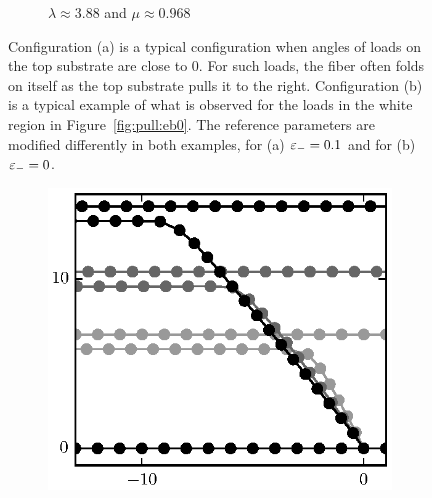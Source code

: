 \begin{figure}[t]
\begin{subfigure}{.5\textwidth}
         \caption{$\lambda\approx3.88$ and $\mu\approx0.968$\label{subfig:barely_adhered}}
      \end{subfigure}
      \caption{Configuration (a) is a typical configuration when angles of loads on the top substrate are close to 0. For such loads, the fiber often folds on itself as the top substrate pulls it to the right. Configuration (b) is a typical example of what is observed for the loads in the white region in Figure~\ref{fig:pull:eb0}. The reference parameters are modified differently in both examples, for (a) $\varepsilon_-=0.1$ and for (b) $\varepsilon_-=0$.\label{fig:pull_equil}} 
   \end{figure}

   \begin{figure}[t]
      \centering
      \begin{subfigure}{.5\textwidth}
         \centering
         \includegraphics{./fig/ch3/pull/unzip_anim.eps}
         \caption{\label{subfig:unzip}}
      \end{subfigure}%
      ~
      \begin{subfigure}{.5\textwidth}
         \centering

\end{subfigure}
\end{figure}
